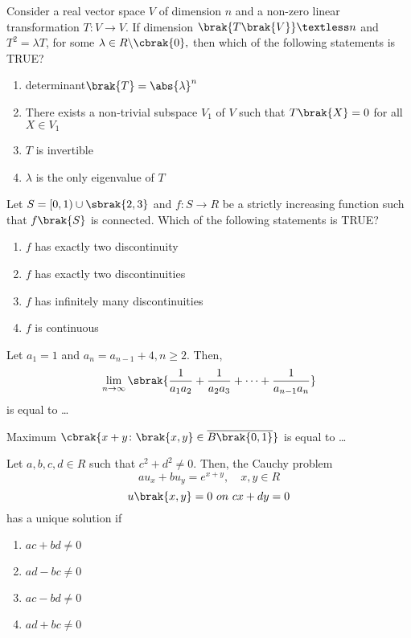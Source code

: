  \iffalse
\chapter{2016}
\author{EE24BTECH11021 - Eshan Ray}
\section{ma}
\fi
    \item Consider a real vector space $V$ of dimension $n$ and a non-zero linear transformation $T\colon V\to V$. If dimension $\brak{T\brak{V}}\textless n$ and $T^2=\lambda T$, for some $\lambda\in R\backslash \cbrak{0},$  then which of the following statements is TRUE?
    \begin{enumerate}
        \item determinant$\brak{T}=\abs{\lambda}^n$
        \item There exists a non-trivial subspace $V_1$ of $V$ such that $T\brak{X}=0$ for all $X\in V_1$
        \item $T$ is invertible
        \item $\lambda$ is the only eigenvalue of $T$
    \end{enumerate}
    \item Let $S=\left[0,1\right)\cup\sbrak{2,3}$ and $f\colon S\to R$ be a strictly increasing function such that $f\brak{S}$ is connected. Which of the following statements is TRUE?
    \begin{enumerate}
        \item $f$ has exactly two discontinuity
        \item $f$ has exactly two discontinuities
        \item $f$ has infinitely many discontinuities
        \item $f$ is continuous
    \end{enumerate}
    \item Let $a_1=1$ and $a_n=a_{n-1}+4,n\geq 2.$ Then,
        $$\lim_{n\to\infty}\sbrak{\frac{1}{a_1a_2}+\frac{1}{a_2a_3}+\dots+\frac{1}{a_{n-1}a_n}}$$
        is equal to \dots
    \item Maximum $\cbrak{x+y\colon\brak{x,y}\in\overline{B\brak{0,1}}}$ is equal to \dots
    \item Let $a,b,c,d\in R$ such that $c^2+d^2\neq 0.$ Then, the Cauchy problem
            $$au_x+bu_y=e^{x+y},\quad x,y\in R$$
            $$u\brak{x,y}=0\,\,on\,\,cx+dy=0$$
            has a unique solution if
            \begin{enumerate}
                \item $ac+bd\neq0$
                \item $ad-bc\neq0$
                \item $ac-bd\neq0$
                \item $ad+bc\neq0$
            \end{enumerate}
